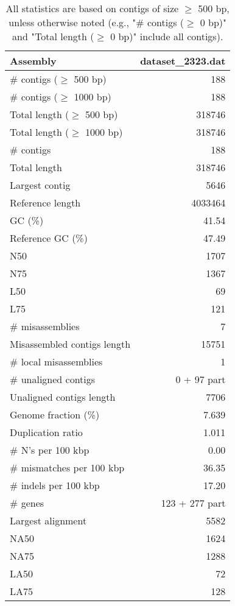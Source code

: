\documentclass[12pt,a4paper]{article}
\begin{document}
\begin{table}[ht]
\begin{center}
\caption{All statistics are based on contigs of size $\geq$ 500 bp, unless otherwise noted (e.g., "\# contigs ($\geq$ 0 bp)" and "Total length ($\geq$ 0 bp)" include all contigs).}
\begin{tabular}{|l*{1}{|r}|}
\hline
Assembly & dataset\_2323.dat \\ \hline
\# contigs ($\geq$ 500 bp) & 188 \\ \hline
\# contigs ($\geq$ 1000 bp) & 188 \\ \hline
Total length ($\geq$ 500 bp) & 318746 \\ \hline
Total length ($\geq$ 1000 bp) & 318746 \\ \hline
\# contigs & 188 \\ \hline
Total length & 318746 \\ \hline
Largest contig & 5646 \\ \hline
Reference length & 4033464 \\ \hline
GC (\%) & 41.54 \\ \hline
Reference GC (\%) & 47.49 \\ \hline
N50 & 1707 \\ \hline
N75 & 1367 \\ \hline
L50 & 69 \\ \hline
L75 & 121 \\ \hline
\# misassemblies & 7 \\ \hline
Misassembled contigs length & 15751 \\ \hline
\# local misassemblies & 1 \\ \hline
\# unaligned contigs & 0 + 97 part \\ \hline
Unaligned contigs length & 7706 \\ \hline
Genome fraction (\%) & 7.639 \\ \hline
Duplication ratio & 1.011 \\ \hline
\# N's per 100 kbp & 0.00 \\ \hline
\# mismatches per 100 kbp & 36.35 \\ \hline
\# indels per 100 kbp & 17.20 \\ \hline
\# genes & 123 + 277 part \\ \hline
Largest alignment & 5582 \\ \hline
NA50 & 1624 \\ \hline
NA75 & 1288 \\ \hline
LA50 & 72 \\ \hline
LA75 & 128 \\ \hline
\end{tabular}
\end{center}
\end{table}
\end{document}
